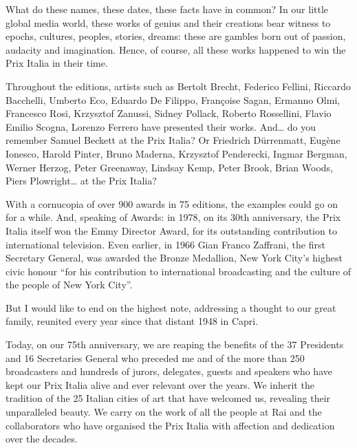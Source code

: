 What do these names, these dates, these facts have in common? In our little global media world, these works of genius and their creations bear witness to epochs, cultures, peoples, stories, dreams: these are gambles born out of passion, audacity and imagination. Hence, of course, all these works happened to win the Prix Italia in their time.

Throughout the editions, artists such as Bertolt Brecht, Federico Fellini, Riccardo Bacchelli, Umberto Eco, Eduardo De Filippo, Françoise Sagan, Ermanno Olmi, Francesco Rosi, Krzysztof Zanussi, Sidney Pollack, Roberto Rossellini, Flavio Emilio Scogna, Lorenzo Ferrero have presented their works. And\dots{} do you remember Samuel Beckett at the Prix Italia? Or Friedrich Dürrenmatt, Eugène Ionesco, Harold Pinter, Bruno Maderna, Krzysztof Penderecki, Ingmar Bergman, Werner Herzog, Peter Greenaway, Lindsay Kemp, Peter Brook, Brian Woods, Piers Plowright\dots{} at the Prix Italia?

With a cornucopia of over 900 awards in 75 editions, the examples could go on for a while. And, speaking of Awards: in 1978, on its 30th anniversary, the Prix Italia itself won the Emmy Director Award, for its outstanding contribution to international television. Even earlier, in 1966 Gian Franco Zaffrani, the first Secretary General, was awarded the Bronze Medallion, New York City's highest civic honour ``for his contribution to international broadcasting and the culture of the people of New York City''. 

But I would like to end on the highest note, addressing a thought to our great family, reunited every year since that distant 1948 in Capri. 

Today, on our 75th anniversary, we are reaping the benefits of the 37 Presidents and 16 Secretaries General who preceded me and of the more than 250 broadcasters and hundreds of jurors, delegates, guests and speakers who have kept our Prix Italia alive and ever relevant over the years. We inherit the tradition of the 25 Italian cities of art that have welcomed us, revealing their unparalleled beauty. We carry on the work of all the people at Rai and the collaborators who have organised the Prix Italia with affection and dedication over the decades. 

